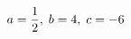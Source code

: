\documentclass[preview]{standalone}
\begin{document}
\begin{align*}
\special{dvisvgm:raw <g id='unique000'>}a=\frac{1}{2},\; b=4,\; c=-6\special{dvisvgm:raw </g>}
\end{align*}
\end{document}
